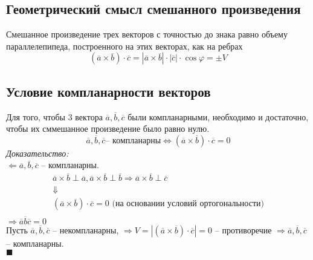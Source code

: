 \documentclass[12pt, fleqn]{article}
\begin{document}
\subsection*{Геометрический смысл смешанного произведения}
Смешанное произведение трех векторов с точностью до знака равно объему параллелепипеда, построенного на этих векторах, как на ребрах
$$\left(\overline{a}\times\overline{b}\right)\cdot\overline{c}=\left|\overline{a}\times\overline{b}\right|\cdot\left|\overline{c}\right|\cdot \cos\varphi=\pm V$$
\subsection*{Условие компланарности векторов}
Для того, чтобы 3 вектора $\overline{a}, \overline{b}, \overline{c}$ были компланарными, необходимо и достаточно, чтобы их сммешанное произведение было равно нулю.
$$\overline{a}, \overline{b}, \overline{c} \text{-- компланарны}\Leftrightarrow \left(\overline{a}\times\overline{b}\right)\cdot\overline{c}=0$$
\textit{Доказательство:}\\
$\boxed{\Leftarrow } \overline{a}, \overline{b},\overline{c}$ -- компланарны.
\begin{multline*}
	\overline{a}\times\overline{b}\perp \overline{a}, \overline{a}\times\overline{b}\perp \overline{b}\Rightarrow \overline{a}\times\overline{b}\perp \overline{c}\\
	\Downarrow\\
	\left(\overline{a}\times\overline{b}\right)\cdot\overline{c}=0 \text{ (на основании условий ортогональности)}\\
\end{multline*}
$\boxed{\Rightarrow } \overline{a}\overline{b}\overline{c}=0$\\
Пусть $\overline{a}, \overline{b}, \overline{c} $ -- некомпланарны, $\Rightarrow V = \left|\left(\overline{a}\times\overline{b}\right)\cdot\overline{c}\right|=0$ -- противоречие $\Rightarrow \overline{a}, \overline{b}, \overline{c}$ -- компланарны.\\
$\blacksquare $\\
\end{document}
